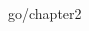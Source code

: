\documentclass[a4paper,11pt]{book}
\begin{document}
\begin{CJK}{UTF8}{song}

\CJKtilde
\CJKindent
 {go/chapter2}

\newpage
\end{CJK}
\end{document}
